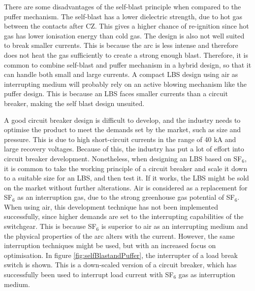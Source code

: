 \documentclass[10pt,b5paper,twoside]{article}
\begin{document}
There are some disadvantages of the self-blast principle when compared to the puffer mechanism. The self-blast has a lower dielectric strength, due to hot gas between the contacts after CZ. This gives a higher chance of re-ignition since hot gas has lower ionisation energy than cold gas. The design is also not well suited to break smaller currents. This is because the arc is less intense and therefore does not heat the gas sufficiently to create a strong enough blast. Therefore, it is common to combine self-blast and puffer mechanism in a hybrid design, so that it can handle both small and large currents. A compact LBS design using air as interrupting medium will probably rely on an active blowing mechanism like the puffer design. This is because an LBS faces smaller currents than a circuit breaker, making the self blast design unsuited.

A good circuit breaker design is difficult to develop, and the industry needs to optimise the product to meet the demands set by the market, such as size and pressure. This is due to high short-circuit currents in the range of 40 kA and large recovery voltages. Because of this, the industry has put a lot of effort into circuit breaker development. Nonetheless, when designing an LBS based on SF$_6$, it is common to take the working principle of a circuit breaker and scale it down to a suitable size for an LBS, and then test it. If it works, the LBS might be sold on the market without further alterations. Air is considered as a replacement for SF$_6$ as an interruption gas, due to the strong greenhouse gas potential of SF$_6$. When using air, this development technique has not been implemented successfully, since higher demands are set to the interrupting capabilities of the switchgear. This is because SF$_6$ is superior to air as an interrupting medium and the physical properties of the arc alters with the current. However, the same interruption techniques might be used, but with an increased focus on optimisation. In figure \ref{fig:selfBlastandPuffer}, the interrupter of a load break switch is shown. This is a down-scaled version of a circuit breaker, which has successfully been used to interrupt load current with SF$_6$ gas as interruption medium. 
\end{document}
